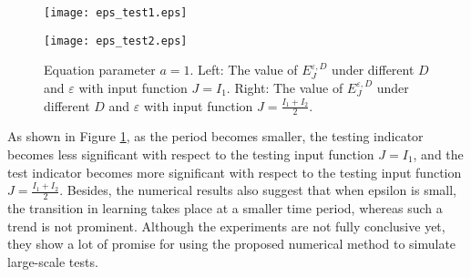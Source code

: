 \begin{figure}[!htb]
    \centering
        \begin{minipage}[c]{0.49\textwidth}
            \centering
            \texttt{[image: eps\_test1.eps]}
        \end{minipage}
        \begin{minipage}[c]{0.49\textwidth}
            \centering
            \texttt{[image: eps\_test2.eps]}
        \end{minipage}
    \caption{Equation parameter $a=1$. Left: The value of $E^{\varepsilon,D}_J$ under different $D$ and $\varepsilon$ with input function $J=I_1$. Right: The value of $E^{\varepsilon,D}_J$ under different $D$ and $\varepsilon$ with input function $J=\frac{I_1+I_2}{2}$.}
    \label{fig:output3}
\end{figure}

 As shown in Figure \ref{fig:output3}, as the period becomes smaller, the testing indicator becomes less significant with respect to the testing input function $J=I_1$, and the test indicator becomes more significant with respect to the testing input function $J=\frac{I_1+I_2}{2}$. Besides, the numerical results also suggest that when epsilon is small, the transition in learning takes place at a smaller time period, whereas such a trend is not prominent. Although the experiments are not fully conclusive yet, they show a lot of promise for using the proposed numerical method to simulate large-scale tests.
